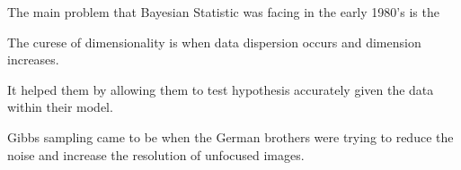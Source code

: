 \documentclass[12pt]{article}
\begin{document}

\begin{enumerate}
\begin{flushleft}
The main problem that Bayesian Statistic was facing in the early 1980's is the 
\end{flushleft}

\begin{flushleft}
The curese of dimensionality is when data dispersion occurs and dimension increases.
\end{flushleft}
\begin{flushleft}
It helped them by allowing them to test hypothesis accurately given the data within their model.
\end{flushleft}
\begin{flushleft}
Gibbs sampling came to be when the German brothers were trying to reduce the noise and increase the resolution of unfocused images. 
\end{flushleft}


\end{enumerate}
\end{document}
